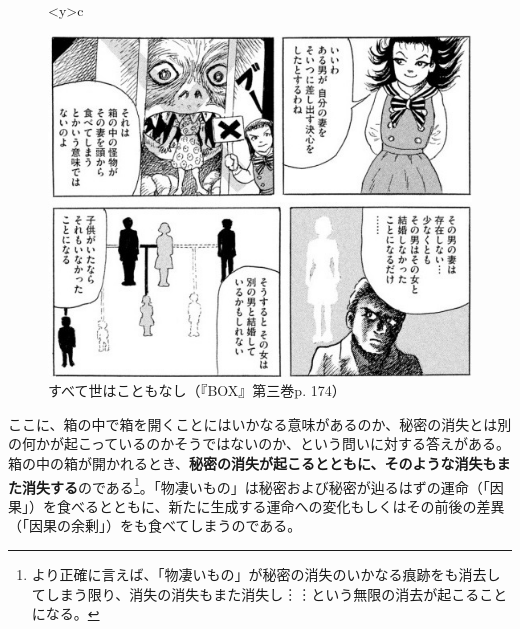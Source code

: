 \documentclass[9pt,b5j,twoside,twocolumn]{utarticle}
\begin{document}
\begin{figure}[h]
\begin{tabular}<y>{c}
\begin{minipage}[c]{0.67\hsize}
	\centering
	\includegraphics[clip, scale=0.45]{因果}
	\caption{すべて世はこともなし（『BOX』第三巻p. 174）}
	\end{minipage}
\end{tabular}
\end{figure}

ここに、箱の中で箱を開くことにはいかなる意味があるのか、秘密の消失とは別の何かが起こっているのかそうではないのか、という問いに対する答えがある。箱の中の箱が開かれるとき、\textbf{秘密の消失が起こるとともに、そのような消失もまた消失する}のである\footnote{より正確に言えば、「物凄いもの」が秘密の消失のいかなる痕跡をも消去してしまう限り、消失の消失もまた消失し︙︙という無限の消去が起こることになる。}。「物凄いもの」は秘密および秘密が辿るはずの運命（「因果」）を食べるとともに、新たに生成する運命への変化もしくはその前後の差異（「因果の余剰」）をも食べてしまうのである。
\end{document}

